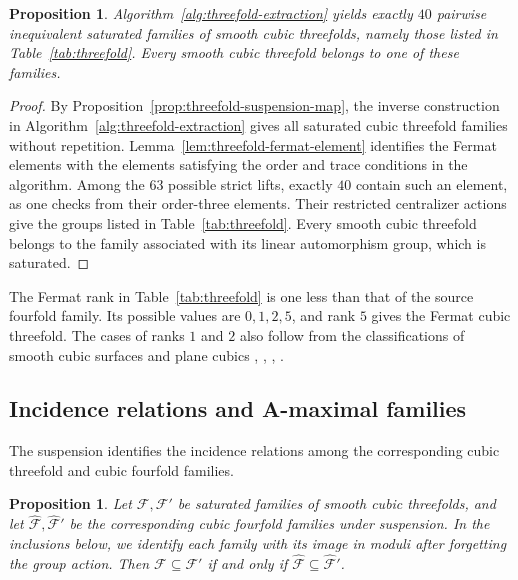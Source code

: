 \documentclass[12pt]{amsart}
\numberwithin{equation}{section}
\theoremstyle{plain}
\newtheorem{prop}[thm]{Proposition}
\theoremstyle{definition}
\theoremstyle{remark}
\newcommand{\calF}{\mathcal F}
\begin{document}
\begin{prop}\label{prop:threefold-extraction}
Algorithm~\ref{alg:threefold-extraction} yields exactly $40$ pairwise
inequivalent saturated families of smooth cubic threefolds, namely those
listed in Table~\ref{tab:threefold}.  Every smooth cubic threefold belongs
to one of these families.
\end{prop}

\begin{proof}
By Proposition~\ref{prop:threefold-suspension-map}, the inverse
construction in Algorithm~\ref{alg:threefold-extraction} gives all
saturated cubic threefold families without repetition.
Lemma~\ref{lem:threefold-fermat-element} identifies the Fermat elements
with the elements satisfying the order and trace conditions in the
algorithm.  Among the $63$ possible strict lifts, exactly $40$ contain
such an element, as one checks from their order-three elements.  Their
restricted centralizer actions give the groups listed in
Table~\ref{tab:threefold}.  Every smooth cubic threefold belongs to the
family associated with its linear automorphism group, which is
saturated.
\end{proof}

The Fermat rank in Table~\ref{tab:threefold} is one less than that of the
source fourfold family.  Its possible values are \(0,1,2,5\), and rank \(5\)
gives the Fermat cubic threefold.  The cases of ranks \(1\) and \(2\) also follow from
the classifications of smooth cubic surfaces and plane cubics
\cite{Hosoh1997}, \cite{Dolgachev2012}, \cite{yang2024automorphism}, \cite{FWZ26}.

\subsection{Incidence relations and A-maximal families}
\label{subsec:threefold-incidence}

The suspension identifies the incidence relations among the corresponding
cubic threefold and cubic fourfold families.

\begin{prop}\label{prop:threefold-containment}
Let $\calF,\calF'$ be saturated families of smooth cubic
threefolds, and let $\widehat{\calF},\widehat{\calF}'$ be the
corresponding cubic fourfold families under suspension. In the inclusions
below, we identify each family with its image in moduli after forgetting
the group action.
Then $\calF\subseteq\calF'$ if and only if
$\widehat{\calF}\subseteq\widehat{\calF}'$.
\end{prop}
\end{document}
